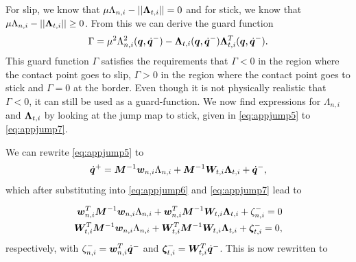 \documentclass[../DC2017114Bouma.tex]{subfiles}
\begin{document}
For slip, we know that $\mu\Lambda_{n,i} - ||\boldsymbol{\Lambda}_{t,i}|| = 0$ and for stick, we know that  $\mu\Lambda_{n,i} - ||\boldsymbol{\Lambda}_{t,i}|| \geq 0$. From this we can derive the guard function
\begin{align}
\Gamma = \mu^2 \Lambda_{n,i}^2({\boldsymbol{q}},\dot{{\boldsymbol{q}}}^-) - \boldsymbol{\Lambda}_{t,i}({\boldsymbol{q}},\dot{{\boldsymbol{q}}}^-)\boldsymbol{\Lambda}_{t,i}^T({\boldsymbol{q}},\dot{{\boldsymbol{q}}}^-). \label{eq:slipset}
\end{align}
This guard function $\Gamma$ satisfies the requirements that $\Gamma<0$ in the region where the contact point goes to slip, $\Gamma > 0$ in the region where the contact point goes to stick and $\Gamma = 0$ at the border. Even though it is not physically realistic that $\Gamma < 0$, it can still be used as a guard-function.
We now find expressions for $\Lambda_{n,i}$ and $\boldsymbol{\Lambda}_{t,i}$ by looking at the jump map to stick, given in \eqref{eq:appjump5} to \eqref{eq:appjump7}.

We can rewrite \eqref{eq:appjump5} to
\begin{align}
\dot{{\boldsymbol{q}}}^+ = {\boldsymbol{M}}^{-1}{\boldsymbol{w}}_{n,i}\Lambda_{n,i} + {\boldsymbol{M}}^{-1}{\boldsymbol{W}}_{t,i}\boldsymbol{\Lambda}_{t,i} + \dot{{\boldsymbol{q}}}^-,
\end{align}
which after substituting into \eqref{eq:appjump6} and \eqref{eq:appjump7} lead to

\begin{align}
{\boldsymbol{w}}_{n,i}^T{\boldsymbol{M}}^{-1}{\boldsymbol{w}}_{n,i}\Lambda_{n,i} + {\boldsymbol{w}}_{n,i}^T{\boldsymbol{M}}^{-1}{\boldsymbol{W}}_{t,i}\boldsymbol{\Lambda}_{t,i} + \zeta_{n,i}^- = 0\\
{\boldsymbol{W}}_{t,i}^T{\boldsymbol{M}}^{-1}{\boldsymbol{w}}_{n,i}\Lambda_{n,i} + {\boldsymbol{W}}_{t,i}^T{\boldsymbol{M}}^{-1}{\boldsymbol{W}}_{t,i}\boldsymbol{\Lambda}_{t,i} + \boldsymbol{\zeta}_{t,i}^- = 0,
\end{align}
respectively, with $\zeta_{n,i}^- = {\boldsymbol{w}}_{n,i}^T\dot{{\boldsymbol{q}}}^-$ and $\boldsymbol{\zeta}_{t,i}^- = {\boldsymbol{W}}_{t,i}^T\dot{{\boldsymbol{q}}}^-$. This is now rewritten to
\end{document}

